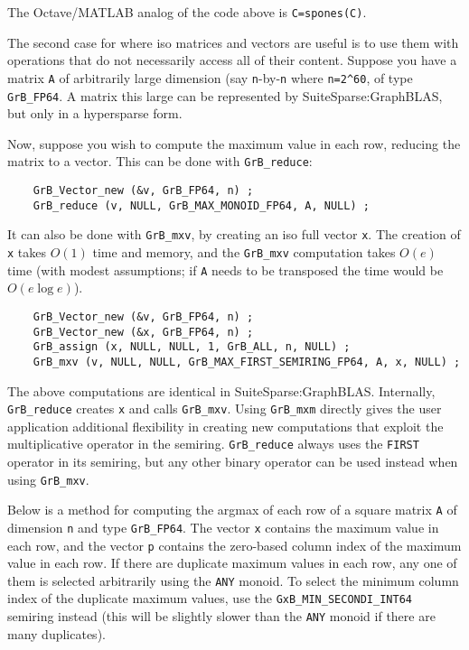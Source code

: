 \documentclass[12pt]{article}
\begin{document}
{The Octave/MATLAB analog of the code above is \verb'C=spones(C)'.

The second case for where iso matrices and vectors are useful is to use them
with operations that do not necessarily access all of their content.
Suppose you have a matrix \verb'A' of arbitrarily large dimension (say
\verb'n'-by-\verb'n' where \verb'n=2^60', of type \verb'GrB_FP64'.  A matrix
this large can be represented by SuiteSparse:GraphBLAS, but only in a
hypersparse form.

Now, suppose you wish to compute the maximum value in each row, reducing the
matrix to a vector.  This can be done with \verb'GrB_reduce':

{\footnotesize
\begin{verbatim}
    GrB_Vector_new (&v, GrB_FP64, n) ;
    GrB_reduce (v, NULL, GrB_MAX_MONOID_FP64, A, NULL) ; \end{verbatim}}

It can also be done with \verb'GrB_mxv', by creating an iso full vector
\verb'x'.  The creation of \verb'x' takes $O(1)$ time and memory,
and the \verb'GrB_mxv' computation takes $O(e)$ time (with modest assumptions;
if \verb'A' needs to be transposed the time would be $O(e \log e)$).

{\footnotesize
\begin{verbatim}
    GrB_Vector_new (&v, GrB_FP64, n) ;
    GrB_Vector_new (&x, GrB_FP64, n) ;
    GrB_assign (x, NULL, NULL, 1, GrB_ALL, n, NULL) ;
    GrB_mxv (v, NULL, NULL, GrB_MAX_FIRST_SEMIRING_FP64, A, x, NULL) ; \end{verbatim}}

The above computations are identical in SuiteSparse:GraphBLAS.  Internally,
\verb'GrB_reduce' creates \verb'x' and calls \verb'GrB_mxv'.  Using
\verb'GrB_mxm' directly gives the user application additional flexibility in
creating new computations that exploit the multiplicative operator in the
semiring.  \verb'GrB_reduce' always uses the \verb'FIRST' operator in its
semiring, but any other binary operator can be used instead when using
\verb'GrB_mxv'.

Below is a method for computing the argmax of each row of a square matrix
\verb'A' of dimension \verb'n' and type \verb'GrB_FP64'.  The vector \verb'x'
contains the maximum value in each row, and the vector \verb'p' contains the
zero-based column index of the maximum value in each row.  If there are
duplicate maximum values in each row, any one of them is selected arbitrarily
using the \verb'ANY' monoid.  To select the minimum column index of the
duplicate maximum values, use the \verb'GxB_MIN_SECONDI_INT64' semiring instead
(this will be slightly slower than the \verb'ANY' monoid if there are many
duplicates).

}
\end{document}
